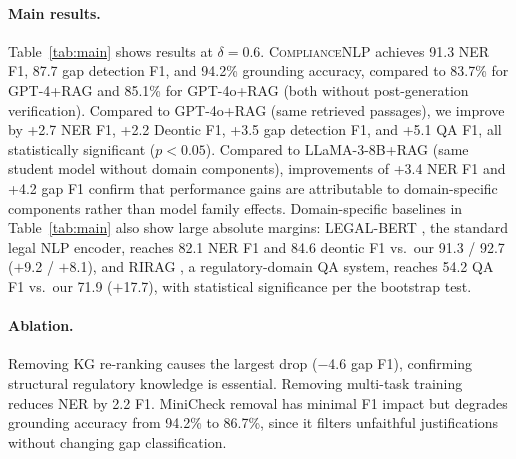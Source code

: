 \documentclass[11pt]{article}
\begin{document}
\paragraph{Main results.}  Table~\ref{tab:main} shows results at $\delta{=}0.6$. \textsc{ComplianceNLP} achieves 91.3 NER F1, 87.7 gap detection F1, and 94.2\% grounding accuracy, compared to 83.7\% for GPT-4+RAG and 85.1\% for GPT-4o+RAG (both without post-generation verification). Compared to GPT-4o+RAG (same retrieved passages), we improve by +2.7 NER F1, +2.2 Deontic F1, +3.5 gap detection F1, and +5.1 QA F1, all statistically significant ($p{<}0.05$). Compared to LLaMA-3-8B+RAG (same student model without domain components), improvements of +3.4 NER F1 and +4.2 gap F1 confirm that performance gains are attributable to domain-specific components rather than model family effects. Domain-specific baselines in Table~\ref{tab:main} also show large absolute margins: LEGAL-BERT \citep{chalkidis2020legalbert}, the standard legal NLP encoder, reaches 82.1 NER F1 and 84.6 deontic F1 vs.\ our 91.3 / 92.7 ($+$9.2 / $+$8.1), and RIRAG \citep{gokhan2025regnlp}, a regulatory-domain QA system, reaches 54.2 QA F1 vs.\ our 71.9 ($+$17.7), with statistical significance per the bootstrap test.

\paragraph{Ablation.}  Removing KG re-ranking causes the largest drop ($-$4.6 gap F1), confirming structural regulatory knowledge is essential. Removing multi-task training reduces NER by 2.2 F1. MiniCheck removal has minimal F1 impact but degrades grounding accuracy from 94.2\% to 86.7\%, since it filters unfaithful justifications without changing gap classification.
\end{document}

